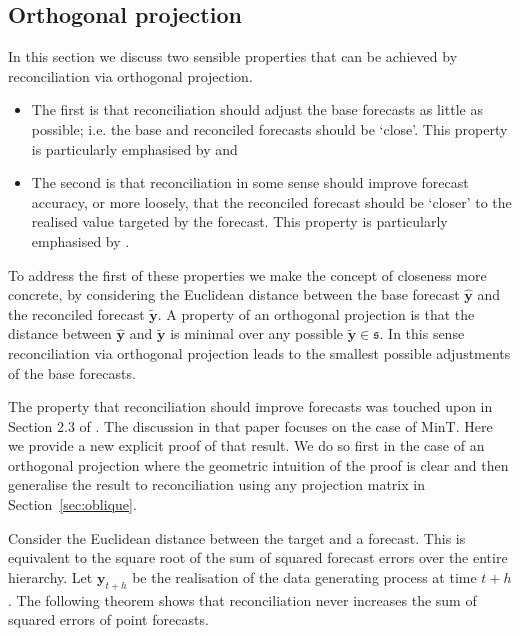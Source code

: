 \documentclass[12pt]{article}
\theoremstyle{definition}
\begin{document}
\subsection{Orthogonal projection}\label{sec:orthogonal}

In this section we discuss two sensible properties that can be achieved by reconciliation via orthogonal projection.
\begin{itemize}
\item The first is that reconciliation should adjust the base forecasts as little as possible; i.e. the base and reconciled forecasts should be `close'.  {\color{blue} This property is particularly emphasised by \cite{VanErven2015a} and \cite{NysEtAl2019}}
\item The second is that reconciliation in some sense should improve forecast accuracy, or more loosely, that the reconciled forecast should be `closer' to the realised value targeted by the forecast.  {\color{blue} This property is particularly emphasised by \cite{WicEtAl2019}.}
\end{itemize}

To address the first of these properties we make the concept of closeness more concrete, by considering the Euclidean distance between the base forecast $\hat{\bm{y}}$ and the reconciled forecast $\tilde{\bm{y}}$. A property of an orthogonal projection is that the distance between $\hat{\bm{y}}$ and $\tilde{\bm{y}}$ is minimal over any possible $\tilde{\bm{y}}\in\mathfrak{s}$. In this sense reconciliation via orthogonal projection leads to the smallest possible adjustments of the base forecasts.

The property that reconciliation should improve forecasts was touched upon in Section 2.3 of \citet{WicEtAl2019}. The discussion in that paper focuses on the case of MinT\@. Here we provide a new explicit proof of that result. We do so first in the case of an orthogonal projection where the geometric intuition of the proof is clear and then generalise the result to reconciliation using any projection matrix in Section~\ref{sec:oblique}.

Consider the Euclidean distance between the target and a forecast. This is equivalent to the square root of the sum of squared forecast errors over the entire hierarchy. Let $\bm{y}_{t+h}$ be the realisation of the data generating process at time $t+h$. The following theorem shows that reconciliation never increases the sum of squared errors of point forecasts.
\end{document}
